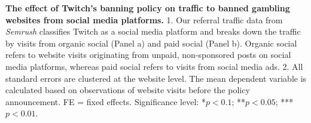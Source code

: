 \documentclass[a4paper,12pt]{article}
\begin{document}
\begin{table}[!htb]
\caption{\textbf{The effect of Twitch's banning policy on traffic to banned gambling websites from social media platforms.} 1. Our referral traffic data from \textit{Semrush} classifies Twitch as a social media platform and breaks down the traffic by visits from organic social (Panel a) and paid social (Panel b). Organic social refers to website visits originating from unpaid, non-sponsored posts on social media platforms, whereas paid social refers to visits from social media ads. 2. All standard errors are clustered at the website level. The mean dependent variable is calculated based on observations of website visits before the policy announcement. FE = fixed effects. Significance level: *$p<0.1$; **$p<0.05$; ***$p<0.01$.}
\label{table:did_traffic_visits_breakdown}
\end{table}

\end{document}
